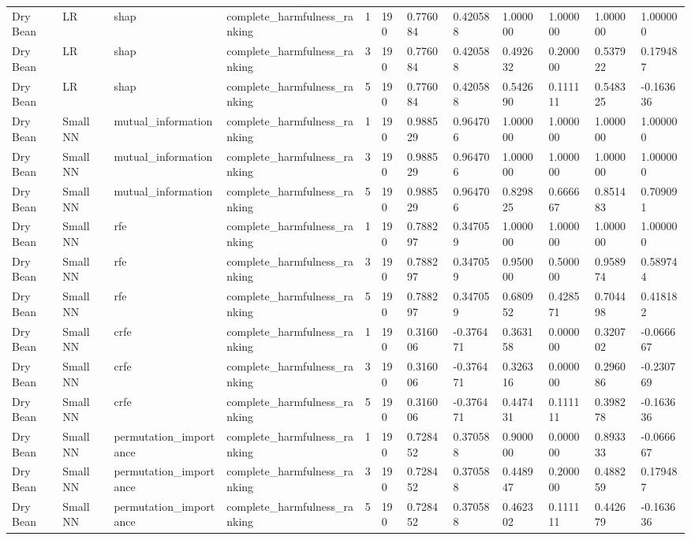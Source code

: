 \begin{table}[t]
\begin{tabular}{llllllllllll}
Dry Bean & LR & shap & complete\_harmfulness\_ranking & 1 & 190 & 0.776084 & 0.420588 & 1.000000 & 1.000000 & 1.000000 & 1.000000 \\
Dry Bean & LR & shap & complete\_harmfulness\_ranking & 3 & 190 & 0.776084 & 0.420588 & 0.492632 & 0.200000 & 0.537922 & 0.179487 \\
Dry Bean & LR & shap & complete\_harmfulness\_ranking & 5 & 190 & 0.776084 & 0.420588 & 0.542690 & 0.111111 & 0.548325 & -0.163636 \\
Dry Bean & Small NN & mutual\_information & complete\_harmfulness\_ranking & 1 & 190 & 0.988529 & 0.964706 & 1.000000 & 1.000000 & 1.000000 & 1.000000 \\
Dry Bean & Small NN & mutual\_information & complete\_harmfulness\_ranking & 3 & 190 & 0.988529 & 0.964706 & 1.000000 & 1.000000 & 1.000000 & 1.000000 \\
Dry Bean & Small NN & mutual\_information & complete\_harmfulness\_ranking & 5 & 190 & 0.988529 & 0.964706 & 0.829825 & 0.666667 & 0.851483 & 0.709091 \\
Dry Bean & Small NN & rfe & complete\_harmfulness\_ranking & 1 & 190 & 0.788297 & 0.347059 & 1.000000 & 1.000000 & 1.000000 & 1.000000 \\
Dry Bean & Small NN & rfe & complete\_harmfulness\_ranking & 3 & 190 & 0.788297 & 0.347059 & 0.950000 & 0.500000 & 0.958974 & 0.589744 \\
Dry Bean & Small NN & rfe & complete\_harmfulness\_ranking & 5 & 190 & 0.788297 & 0.347059 & 0.680952 & 0.428571 & 0.704498 & 0.418182 \\
Dry Bean & Small NN & crfe & complete\_harmfulness\_ranking & 1 & 190 & 0.316006 & -0.376471 & 0.363158 & 0.000000 & 0.320702 & -0.066667 \\
Dry Bean & Small NN & crfe & complete\_harmfulness\_ranking & 3 & 190 & 0.316006 & -0.376471 & 0.326316 & 0.000000 & 0.296086 & -0.230769 \\
Dry Bean & Small NN & crfe & complete\_harmfulness\_ranking & 5 & 190 & 0.316006 & -0.376471 & 0.447431 & 0.111111 & 0.398278 & -0.163636 \\
Dry Bean & Small NN & permutation\_importance & complete\_harmfulness\_ranking & 1 & 190 & 0.728452 & 0.370588 & 0.900000 & 0.000000 & 0.893333 & -0.066667 \\
Dry Bean & Small NN & permutation\_importance & complete\_harmfulness\_ranking & 3 & 190 & 0.728452 & 0.370588 & 0.448947 & 0.200000 & 0.488259 & 0.179487 \\
Dry Bean & Small NN & permutation\_importance & complete\_harmfulness\_ranking & 5 & 190 & 0.728452 & 0.370588 & 0.462302 & 0.111111 & 0.442679 & -0.163636 \\

\end{tabular}
\end{table}
